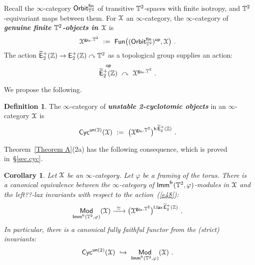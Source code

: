 \documentclass{amsart}
\newtheorem{cor}[theorem]{Corollary}
\theoremstyle{definition}
\newtheorem{definition}[theorem]{Definition}
\theoremstyle{remark}
\DeclareMathOperator{\Mod}{\sf Mod}
\DeclareMathOperator{\Fun}{{\sf Fun}}
\newcommand{\bit}[1]{\textbf{\textit{#1}}}
\newcommand{\lacts}{\curvearrowright}
\DeclareMathOperator{\op}{\mathsf{op}}
\DeclareMathOperator{\fr}{\sf fr}
\newcommand{\w}{\widetilde}
\newcommand{\un}{\underline}
\newcommand{\xra}{\xrightarrow}
\def\sE{\mathsf E}\def\sF{\mathsf F}\def\sG{\mathsf G}\def\sH{\mathsf H}
\DeclareMathOperator{\Ebraid}{\w{\sf E}_{2}^{+}(\ZZ)}
\DeclareMathOperator{\Imm}{\sf Imm}
\DeclareMathOperator{\EpZ}{\sE^+_2(\ZZ)}
\begin{document}
{\color{magenta}
Recall the $\infty$-category ${\sf Orbit}_{\mathbb T^2}^{\sf fin}$ of transitive $\mathbb T^2$-spaces with finite isotropy, and $\mathbb T^2$-equivariant maps between them. 
For $\mathcal X$ an $\infty$-category, the $\infty$-category of \bit{genuine finite $\mathbb T^2$-objects in $\mathcal X$} is
\[
\cX^{{\sf g}_{\sf fin}. \TT^2}
~:=~
\Fun\bigl(
({\sf Orbit}^{\sf fin}_{\TT^2})^{\op} , \cX
\bigr)
~.
\]
The action $\Ebraid \to \EpZ \lacts \TT^2$ as a topological group supplies an action:
\begin{equation}
\label{e48}
\Ebraid^{\op}~ \lacts~ \cX^{{\sf g}_{\sf fin}. \TT^2}
~.
\end{equation}


We propose the following.
\begin{definition}
\label{d2}
The $\infty$-category of \bit{unstable 2-cyclotomic objects} in an $\infty$-category $\mathcal X$ is
\[
{\sf Cyc}^{{\sf un} (2)}(\cX)
~:=~
\bigl( \cX^{{\sf g}_{\sf fin}. \TT^2}\bigr)^{{\sf h}\Ebraid}
~.
\]


\end{definition}











Theorem~\ref{Theorem A}(2a) has the following consequence, which is proved in~\S\ref{sec.cyc}.
\begin{cor}
\label{t30}
Let $\mathcal X$ be an $\infty$-category.
Let $\varphi$ be a framing of the torus.
There is a canonical equivalence between the $\infty$-category of $\Imm^{\fr}(\TT^2,\varphi)$-modules in $\mathcal X$ and the left??-lax invariants with respect to the action~(\ref{e48}):
\[
\Mod_{\Imm^{\fr}(\TT^2 , \varphi)} ( \cX )
\xra{~\simeq~}
\bigl( \cX^{{\sf g}_{\sf fin}. \TT^2}\bigr)^{{\sf l.lax} \Ebraid}
~.
\]
In particular, there is a canonical fully faithful functor from the (strict) invariants:
\[
{\sf Cyc}^{{\sf un} (2)}(\cX)
~\hookrightarrow~
\Mod_{\Imm^{\fr}(\TT^2 , \varphi)} ( \cX )
~.
\]



\end{cor}}
\end{document}
